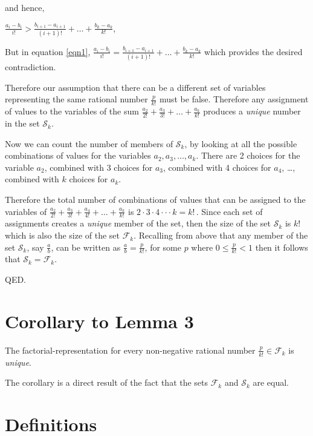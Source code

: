 \documentclass{article}
\begin{document}
and hence,

\begin{center}
\(\frac{a_i - b_i}{i!} > \frac{b_{i+1} - a_{i+1}}{(i+1)!} + \dots{} + \frac{b_k - a_k}{k!}\),
\end{center}

But in equation \eqref{eqn1},
\(\frac{a_i - b_i}{i!} = \frac{b_{i+1} - a_{i+1}}{(i+1)!} + \dots{} + \frac{b_k - a_k}{k!}\)
which provides the desired contradiction.

Therefore our assumption that there can be a different set
of variables representing the same rational number \(\frac{p}{k!}\) must be false.
Therefore any assignment of values to the variables of the sum
\(\frac{a_2}{2!} + \frac{a_3}{3!} + \dots{} + \frac{a_k}{k!}\)
produces a \emph{unique} number in the set \(\mathcal{S}_k\).

Now we can count the number of members of \(\mathcal{S}_k\), by looking at all the
possible combinations of values for the variables \(a_2, a_3, \dots{}, a_k\).
There are 2 choices for the variable \(a_2\),
combined with 3 choices for \(a_3\),
combined with 4 choices for \(a_4\),
\dots{},
combined with \(k\) choices for \(a_k\).

Therefore the total number of combinations of values
that can be assigned to the variables of
\(\frac{a_2}{2!}
+ \frac{a_3}{3!}
+ \frac{a_4}{4!}
+ \dots{} + \frac{a_k}{k!}\)
is \(2\cdot{}3\cdot{}4\cdot\cdot{}\cdot{}k = k!\,\). Since each set of assignments 
creates a \emph{unique} member of the set, then the size of the set \(\mathcal{S}_k\) is \(k!\)
which is also the size of the set \(\mathcal{F}_k\).
Recalling from above that any 
member of the set \(\mathcal{S}_k\), say \(\frac{a}{b}\),
can be written as \(\frac{a}{b} = \frac{p}{k!}\), for some \(p\) where 
\(0\le{}\frac{p}{k!}<1\) then it follows that
\(\mathcal{S}_k = \mathcal{F}_k\).

QED.

\section*{Corollary to Lemma 3}

The factorial-representation for every non-negative rational number \(\frac{p}{k!} \in \mathcal{F}_k\) is 
\emph{unique}.

The corollary is a direct result of the fact that
the sets
\(\mathcal{F}_k\) and
\(\mathcal{S}_k\) are equal.

\section*{Definitions}
\end{document}

